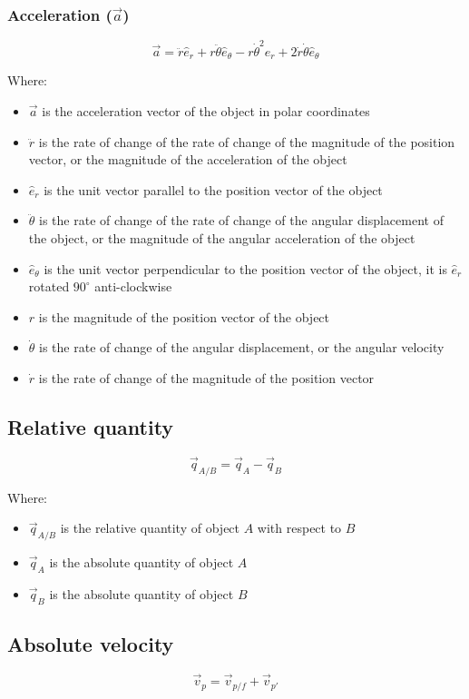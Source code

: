 \documentclass[11pt]{article}
\begin{document}
 \newpage
\subsubsection{Acceleration (\(\vec{a}\))}
\label{sec:org6f5abbe}
\label{orgcf8331e}
\[\vec{a} = \ddot{r} \hat{e}_r + r \ddot{\theta} \hat{e}_{\theta} - r \dot{\theta}^2 \hat{e}_r + 2 \dot{r} \dot{\theta} \hat{e}_{\theta}\]

Where:
\begin{itemize}
\item \(\vec{a}\) is the acceleration vector of the object in polar coordinates
\item \(\ddot{r}\) is the rate of change of the rate of change of the magnitude of the position vector, or the magnitude of the acceleration of the object
\item \(\hat{e}_r\) is the unit vector parallel to the position vector of the object
\item \(\ddot{\theta}\) is the rate of change of the rate of change of the angular displacement of the object, or the magnitude of the angular acceleration of the object
\item \(\hat{e}_{\theta}\) is the unit vector perpendicular to the position vector of the object, it is \(\hat{e}_r\) rotated \(90^{\circ}\) anti-clockwise
\item \(r\) is the magnitude of the position vector of the object
\item \(\dot{\theta}\) is the rate of change of the angular displacement, or the angular velocity
\item \(\dot{r}\) is the rate of change of the magnitude of the position vector
\end{itemize}
\subsection{Relative quantity}
\label{sec:org381b85b}
\[\vec{q}_{A/B} = \vec{q}_A - \vec{q}_B\]

Where:
\begin{itemize}
\item \(\vec{q}_{A/B}\) is the relative quantity of object \(A\) with respect to \(B\)
\item \(\vec{q}_A\) is the absolute quantity of object \(A\)
\item \(\vec{q}_B\) is the absolute quantity of object \(B\)
\end{itemize}
\subsection{Absolute velocity}
\label{sec:org5b9bec7}
\[\vec{v}_p = \vec{v}_{p/f} + \vec{v}_{p'}\]
\end{document}
